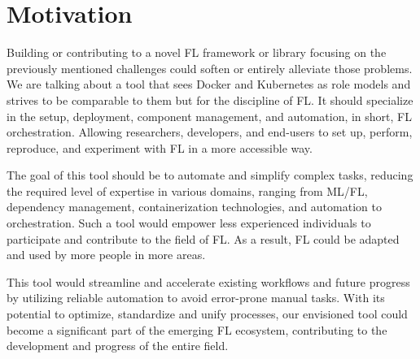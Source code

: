 \section{Motivation}

Building or contributing to a novel FL framework or library focusing on 
the previously mentioned challenges could soften or entirely alleviate those problems. 
We are talking about a tool that sees Docker \cite{docker_docs} and Kubernetes \cite{kubernetes_docs} as role models
and strives to be comparable to them but for the discipline of FL.
It should specialize in the setup, deployment, component management, and automation,
in short, FL orchestration.
Allowing researchers, developers, and end-users to set up, perform, reproduce,
and experiment with FL in a more accessible way.

The goal of this tool should be to automate and simplify complex tasks,
reducing the required level of expertise in various domains, ranging from ML/FL,
dependency management, containerization technologies, and automation to orchestration.
Such a tool would empower less experienced individuals to participate and contribute to the field of FL.
As a result, FL could be adapted and used by more people in more areas.

This tool would streamline and accelerate existing workflows and future progress
by utilizing reliable automation to avoid error-prone manual tasks.
With its potential to optimize, standardize and unify processes,
our envisioned tool could become a significant part of the emerging FL ecosystem,
contributing to the development and progress of the entire field.